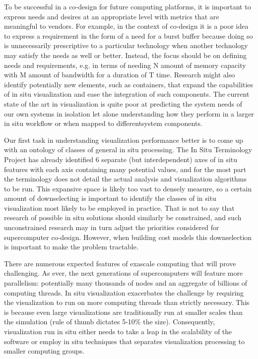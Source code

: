 \begin{refsection}
To be successful in a co-design for future computing platforms, it is important to express needs and desires at an appropriate level with metrics that are meaningful to vendors. For example, in the context of co-design it is a poor idea to express a requirement in the form of a need for a burst buffer because doing so is unnecessarily prescriptive to a particular technology when another technology may satisfy the needs as well or better. Instead, the focus should be on defining needs and requirements, e.g. in terms of needing N amount of memory capacity with M amount of bandwidth for a duration of T time. Research might also identify potentially new elements, such as containers, that expand the capabilities of in situ visualization and ease the integration of such components.
The current state of the art in visualization is quite poor at predicting the system needs of our own systems in isolation let alone understanding how they perform in a larger in situ workflow or when mapped to differentsystem components. 

Our first task in understanding visualization performance better is to come up with an ontology of classes of general in situ processing. The In Situ Terminology Project has already identified 6 separate (but interdependent) axes of in situ features with each axis containing many potential values, and for the most part the terminology does not detail the actual analysis and visualization algorithms to be run. This expansive space is likely too vast to densely measure, so a certain amount of downselecting is important to identify the classes of in situ visualization most likely to be employed in practice. That is not to say that research of possible in situ solutions should similarly be constrained, and such unconstrained research may in turn adjust the priorities considered for supercomputer co-design. However, when building cost models this downselection is important to make the problem tractable.

There are numerous expected features of exascale computing that will prove challenging. As ever, the next generations of supercomputers will feature more parallelism: potentially many thousands of nodes and an aggregate of billions of computing threads. In situ visualization exacerbates the challenge by requiring the visualization to run on more computing threads than strictly necessary. This is because even large visualizations are traditionally run at smaller scales than the simulation (rule of thumb dictates 5-10\% the size). Consequently, visualization run in situ either needs to take a leap in the scalability of the software or employ in situ techniques that separates visualization processing to smaller computing groups.


\end{refsection}

